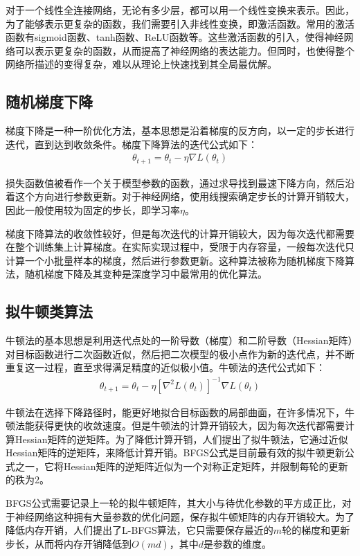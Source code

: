 \documentclass{article}
\begin{document}
对于一个线性全连接网络，无论有多少层，都可以用一个线性变换来表示。因此，为了能够表示更复杂的函数，我们需要引入非线性变换，即激活函数。常用的激活函数有sigmoid函数、tanh函数、ReLU函数等。这些激活函数的引入，使得神经网络可以表示更复杂的函数，从而提高了神经网络的表达能力。但同时，也使得整个网络所描述的变得复杂，难以从理论上快速找到其全局最优解。

\subsection{随机梯度下降}

梯度下降是一种一阶优化方法，基本思想是沿着梯度的反方向，以一定的步长进行迭代，直到达到收敛条件。梯度下降算法的迭代公式如下：
\begin{align*}
\theta_{t+1} = \theta_t - \eta \nabla L(\theta_t)
\end{align*}

损失函数值被看作一个关于模型参数的函数，通过求导找到最速下降方向，然后沿着这个方向进行参数更新。对于神经网络，使用线搜索确定步长的计算开销较大，因此一般使用较为固定的步长，即学习率$\eta$。

梯度下降算法的收敛性较好，但是每次迭代的计算开销较大，因为每次迭代都需要在整个训练集上计算梯度。在实际实现过程中，受限于内存容量，一般每次迭代只计算一个小批量样本的梯度，然后进行参数更新。这种算法被称为随机梯度下降算法，随机梯度下降及其变种是深度学习中最常用的优化算法。

\subsection{拟牛顿类算法}

牛顿法的基本思想是利用迭代点处的一阶导数（梯度）和二阶导数（Hessian矩阵）对目标函数进行二次函数近似，然后把二次模型的极小点作为新的迭代点，并不断重复这一过程，直至求得满足精度的近似极小值。牛顿法的迭代公式如下：
\begin{align*}
\theta_{t+1} = \theta_t - \eta [\nabla^2 L(\theta_t)]^{-1} \nabla L(\theta_t)
\end{align*}

牛顿法在选择下降路径时，能更好地拟合目标函数的局部曲面，在许多情况下，牛顿法能获得更快的收敛速度。但是牛顿法的计算开销较大，因为每次迭代都需要计算Hessian矩阵的逆矩阵。为了降低计算开销，人们提出了拟牛顿法，它通过近似Hessian矩阵的逆矩阵，来降低计算开销。BFGS公式是目前最有效的拟牛顿更新公式之一，它将Hessian矩阵的逆矩阵近似为一个对称正定矩阵，并限制每轮的更新的秩为2。

BFGS公式需要记录上一轮的拟牛顿矩阵，其大小与待优化参数的平方成正比，对于神经网络这种拥有大量参数的优化问题，保存拟牛顿矩阵的内存开销较大。为了降低内存开销，人们提出了L-BFGS算法，它只需要保存最近的$m$轮的梯度和更新步长，从而将内存开销降低到$O(md)$，其中$d$是参数的维度。
\end{document}
